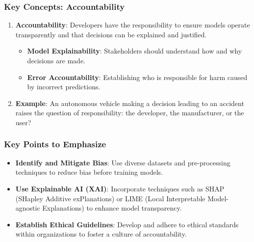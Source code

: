 \documentclass{beamer}
\begin{document}
\begin{frame}[fragile]
    \frametitle{Key Concepts: Accountability}
    \begin{enumerate}
        \item \textbf{Accountability}: Developers have the responsibility to ensure models operate transparently and that decisions can be explained and justified.
        \begin{itemize}
            \item \textbf{Model Explainability}: Stakeholders should understand how and why decisions are made.
            \item \textbf{Error Accountability}: Establishing who is responsible for harm caused by incorrect predictions.
        \end{itemize}

        \item \textbf{Example}: An autonomous vehicle making a decision leading to an accident raises the question of responsibility: the developer, the manufacturer, or the user?
    \end{enumerate}
\end{frame}

\begin{frame}[fragile]
    \frametitle{Key Points to Emphasize}
    \begin{itemize}
        \item \textbf{Identify and Mitigate Bias}: Use diverse datasets and pre-processing techniques to reduce bias before training models.
        
        \item \textbf{Use Explainable AI (XAI)}: Incorporate techniques such as SHAP (SHapley Additive exPlanations) or LIME (Local Interpretable Model-agnostic Explanations) to enhance model transparency.
        
        \item \textbf{Establish Ethical Guidelines}: Develop and adhere to ethical standards within organizations to foster a culture of accountability.
    \end{itemize}
\end{frame}
\end{document}
